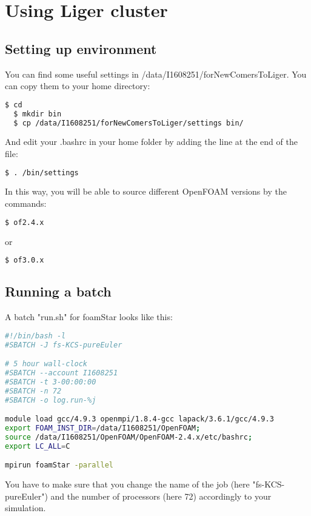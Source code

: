 \chapter{Using Liger cluster}

\section{Setting up environment}

You can find some useful settings in /data/I1608251/forNewComersToLiger. You can copy them to your home directory:

\begin{lstlisting}[language=bash]
  $ cd
  $ mkdir bin 
  $ cp /data/I1608251/forNewComersToLiger/settings bin/
\end{lstlisting}

And edit your .bashrc in your home folder by adding the line at the end of the file:
\begin{lstlisting}[language=bash]
  $ . /bin/settings
\end{lstlisting}

In this way, you will be able to source different OpenFOAM versions by the commands:
\begin{lstlisting}[language=bash]
  $ of2.4.x
\end{lstlisting}
or
\begin{lstlisting}[language=bash]
  $ of3.0.x
\end{lstlisting}

\section{Running a batch}

A batch "run.sh" for foamStar looks like this:
\begin{lstlisting}[language=bash]
#!/bin/bash -l
#SBATCH -J fs-KCS-pureEuler

# 5 hour wall-clock 
#SBATCH --account I1608251
#SBATCH -t 3-00:00:00
#SBATCH -n 72
#SBATCH -o log.run-%j

module load gcc/4.9.3 openmpi/1.8.4-gcc lapack/3.6.1/gcc/4.9.3
export FOAM_INST_DIR=/data/I1608251/OpenFOAM;
source /data/I1608251/OpenFOAM/OpenFOAM-2.4.x/etc/bashrc;
export LC_ALL=C

mpirun foamStar -parallel
\end{lstlisting}
You have to make sure that you change the name of the job (here "fs-KCS-pureEuler") and the number of processors (here 72) accordingly to your simulation.


